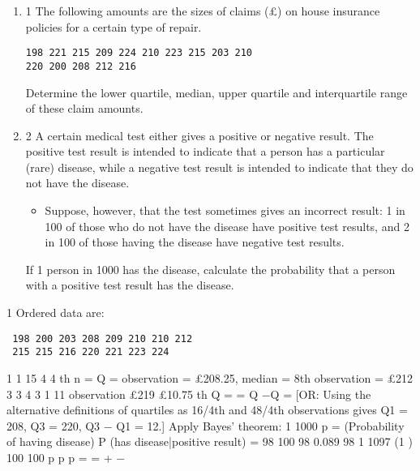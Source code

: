 \documentclass[a4paper,12pt]{article}
\begin{document}
\begin{enumerate}
\item 1 The following amounts are the sizes of claims (£) on house insurance policies for a
certain type of repair.
\begin{verbatim}
198 221 215 209 224 210 223 215 203 210
220 200 208 212 216
\end{verbatim}

Determine the lower quartile, median, upper quartile and interquartile range of
these claim amounts. 
\item 2 A certain medical test either gives a positive or negative result. The positive test
result is intended to indicate that a person has a particular (rare) disease, while
a negative test result is intended to indicate that they do not have the disease.
\begin{itemize}
    \item Suppose, however, that the test sometimes gives an incorrect result: 1 in 100 of
those who do not have the disease have positive test results, and 2 in 100 of those
having the disease have negative test results.
\end{itemize}

If 1 person in 1000 has the disease, calculate the probability that a person with a
positive test result has the disease. 

\end{enumerate}
\newpage

1 Ordered data are:
\begin{verbatim}
 198 200 203 208 209 210 210 212 
 215 215 216 220 221 223 224   
\end{verbatim}

1
1
15 4
4
th
n = Q = observation = £208.25, median = 8th observation = £212
3
3 4 3 1 11 observation £219 £10.75 th Q = = Q −Q =
[OR: Using the alternative definitions of quartiles as 16/4th and 48/4th
observations gives Q1 = 208, Q3 = 220, Q3 − Q1 = 12.]
 Apply Bayes' theorem:
1
1000
p = (Probability of having disease)
P (has disease|positive result) =
98
100 98 0.089
98 1 1097 (1 )
100 100
p
p p
= =
+ −
\end{document}
